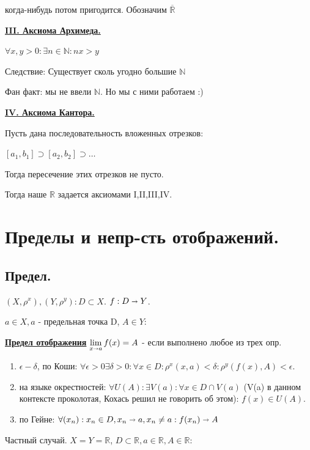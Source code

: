 \documentclass{article}
\newcommand{\deff}[1]{\underline{\textbf{#1}}}
\begin{document}
когда-нибудь потом пригодится. Обозначим $\overline{\mathbb{R}}$

\deff{III. Аксиома Архимеда.}

$\forall x,y>0: \exists n \in \mathbb{N}:nx>y$

Следствие: Существует сколь угодно большие $\mathbb{N}$

Фан факт: мы не ввели $\mathbb{N}$. Но мы с ними работаем :)

\deff{IV. Аксиома Кантора.}

Пусть дана последовательность вложенных отрезков:

$[a_1,b_1] \supset [a_2,b_2] \supset \ldots$

Тогда пересечение этих отрезков не пусто.

Тогда наше $\mathbb{R}$ задается аксиомами I,II,III,IV.

\pagebreak

\section{Пределы и непр-сть отображений.}
\subsection{Предел. }
$(X,\rho^x),(Y,\rho^y): D \subset X$. $f:D \shortrightarrow Y$.

$a \in X, a$ - предельная точка D, $A \in Y$:

\deff{Предел отображения} $\lim\limits_{x\shortrightarrow a} f(x) = A$ - если выполнено любое из трех опр.

\begin{enumerate}
    \item $\epsilon-\delta$, по Коши: $\forall \epsilon>0 \exists \delta>0:\forall x\in D: \rho^x(x,a)<\delta : \rho^y(f(x),A)<\epsilon$.

    \item на языке окрестностей: $\forall U(A):\exists V(a): \forall x \in D \cap V(a)$ (V(a) в данном контексте проколотая, Кохась решил не говорить об этом): $f(x) \in U(A)$.

    \item по Гейне: $\forall(x_n): x_n \in D, x_n\shortrightarrow a, x_n \neq a: f(x_n) \shortrightarrow A$
    
\end{enumerate}

Частный случай. $X=Y=\mathbb{R}$, $D\subset \mathbb{R}, a \in \mathbb{R}, A 
\in \mathbb{R}$:
\end{document}
